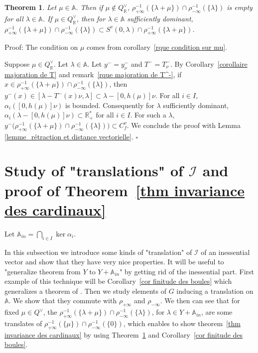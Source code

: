 \documentclass[12pt]{article}
\theoremstyle{plain}
\newtheorem{thm}{Theorem}[section] %
\theoremstyle{definition}
\newcommand{\R}{\mathbb{R}}
\newcommand{\A}{\mathbb{A}}
\newcommand{\I}{\mathcal{I}}
\begin{document}
\begin{thm}\label{thm inclusion}
Let $\mu\in \A$. Then if $\mu\notin Q_{\R}^\vee$, $\rho_{+\infty}^{-1}(\{\lambda+\mu\})\cap \rho_{-\infty}^{-1}(\{\lambda\})$ is empty for all $\lambda\in \A$. If $\mu\in Q^\vee_{\R}$, then for $\lambda\in \A$ sufficiently dominant, $\rho_{+\infty}^{-1}(\{\lambda+\mu\})\cap \rho_{-\infty}^{-1}(\{\lambda\})\subset S^v(0,\lambda)\cap \rho_{+\infty}^{-1}(\{\lambda+\mu\}) $. 
\end{thm}

Proof: The condition on $\mu$ comes from corollary~\ref{rque condition sur mu}. 

Suppose $\mu\in Q^\vee_\R$.
Let $\lambda\in \A$. Let $y^-=y^-_\nu$ and $T^-=T_\nu^-$. By Corollary~\ref{corollaire majoration de T} and remark~\ref{rque majoration de T^-}, if $x\in \rho_{+\infty}^{-1}(\{\lambda+\mu\})\cap \rho_{-\infty}^{-1}(\{\lambda\})$, then $y^-(x)\in [\lambda-T^-(x)\nu, \lambda]\subset \lambda-[0,h(\mu)]\nu$. 
For all $i\in I$, $\alpha_i([0,h(\mu)]\nu)$ is bounded. Consequently for $\lambda$ sufficiently dominant, $\alpha_i(\lambda-[0,h(\mu)]\nu)\subset \mathbb{R}^*_+$ for all $i\in I$.  For such a $\lambda$,  $y^-\big(\rho_{+\infty}^{-1}(\{\lambda+\mu\})\cap \rho_{-\infty}^{-1}(\{\lambda\})\big)\subset C^v_f$. We conclude the proof with Lemma \ref{lemme_rétraction et distance vectorielle}.
 $\square$

\section{Study of "translations" of $\I$ and proof of Theorem~\ref{thm invariance des cardinaux}}\label{sect translations}

Let $\A_{in}=\bigcap_{i\in I} \ker \alpha_i$.

In this subsection we introduce some kinds of "translation" of $\I$ of an inessential vector and show that they have very nice properties. It will be useful to "generalize theorem from $Y$ to $Y+\A_{in}$" by getting rid of the inessential part. First example of this technique will be Corollary~\ref{cor finitude des boules} which generalizes a theorem of \cite{gaussent2014spherical}. Then we study elements of $G$ inducing a translation on $\A$. We show that they commute with $\rho_{+\infty}$ and $\rho_{-\infty}$. We then can see that for fixed $\mu\in Q^\vee$, the $\rho_{+\infty}^{-1}(\{\lambda+\mu\})\cap\rho_{-\infty}^{-1}(\{\lambda\})$, for $\lambda\in Y+\A_{in}$, are some translates of  $\rho_{+\infty}^{-1}(\{\mu\})\cap\rho_{-\infty}^{-1}(\{0\})$, which enables to show theorem~\ref{thm invariance des cardinaux} by using Theorem~\ref{thm inclusion} and Corollary~\ref{cor finitude des boules}.
\end{document}
